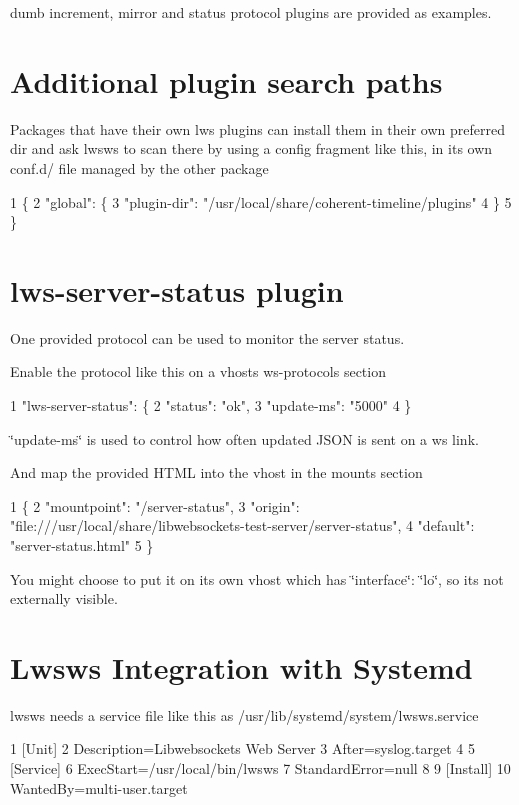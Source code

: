dumb increment, mirror and status protocol plugins are provided as examples.\hypertarget{md_README.lwsws_lwswsplaplp}{}\section{Additional plugin search paths}\label{md_README.lwsws_lwswsplaplp}
Packages that have their own lws plugins can install them in their own preferred dir and ask lwsws to scan there by using a config fragment like this, in its own conf.\+d/ file managed by the other package 
\begin{DoxyCode}
1 \{
2   "global": \{
3    "plugin-dir": "/usr/local/share/coherent-timeline/plugins"
4   \}
5 \}
\end{DoxyCode}
\hypertarget{md_README.lwsws_lwswsssp}{}\section{lws-\/server-\/status plugin}\label{md_README.lwsws_lwswsssp}
One provided protocol can be used to monitor the server status.

Enable the protocol like this on a vhost\textquotesingle{}s ws-\/protocols section 
\begin{DoxyCode}
1 "lws-server-status": \{
2   "status": "ok",
3   "update-ms": "5000"
4 \}
\end{DoxyCode}
 \char`\"{}update-\/ms\char`\"{} is used to control how often updated J\+S\+ON is sent on a ws link.

And map the provided H\+T\+ML into the vhost in the mounts section 
\begin{DoxyCode}
1 \{
2  "mountpoint": "/server-status",
3  "origin": "file:///usr/local/share/libwebsockets-test-server/server-status",
4  "default": "server-status.html"
5 \}
\end{DoxyCode}
 You might choose to put it on its own vhost which has \char`\"{}interface\char`\"{}\+: \char`\"{}lo\char`\"{}, so it\textquotesingle{}s not externally visible.\hypertarget{md_README.lwsws_lwswssysd}{}\section{Lwsws Integration with Systemd}\label{md_README.lwsws_lwswssysd}
lwsws needs a service file like this as {\ttfamily /usr/lib/systemd/system/lwsws.service} 
\begin{DoxyCode}
1 [Unit]
2 Description=Libwebsockets Web Server
3 After=syslog.target
4 
5 [Service]
6 ExecStart=/usr/local/bin/lwsws
7 StandardError=null
8 
9 [Install]
10 WantedBy=multi-user.target
\end{DoxyCode}


